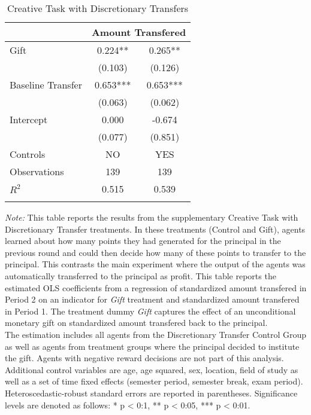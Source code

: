 \begin{table}[h]%
\setlength\tabcolsep{6pt}
\caption{Creative Task with Discretionary Transfers}
\begin{center}%
{\small\renewcommand{\arraystretch}{1.2}%
\begin{tabular}{lcc}
\hline\hline\noalign{\smallskip}
 & \multicolumn{2}{c}{\bf Amount Transfered} \\
\hline\noalign{\smallskip}
Gift                &       0.224** &       0.265** \\
                    &     (0.103)   &     (0.126)   \\
Baseline Transfer   &       0.653***&       0.653***\\
                    &     (0.063)   &     (0.062)   \\
Intercept           &       0.000   &      -0.674   \\
                    &     (0.077)   &     (0.851)   \\
\hline
 Controls & NO & YES \\
\hline
Observations        &         139   &         139   \\
$R^2$               &       0.515   &       0.539   \\
\hline\hline\noalign{\medskip}
\end{tabular}
\begin{minipage}{\textwidth}
\footnotesize {\it Note:} This table reports the results from the supplementary Creative Task with Discretionary Transfer treatments. 
In these treatments (Control and Gift), agents learned about how many points they had generated for the principal in the previous round and could then decide how many of these points to transfer to the principal. 
This contrasts the main experiment where the output of the agents was automatically transferred to the principal as profit. 
This table reports the estimated OLS coefficients from a regression of standardized amount transfered in Period 2 on an indicator for \textit{Gift} treatment and standardized amount transfered in Period 1. 
The treatment dummy \textit{Gift} captures the effect of an unconditional monetary gift on standardized amount transfered back to the principal. \\
The estimation includes all agents from the Discretionary Transfer Control Group as well as agents from treatment groups where the principal decided to institute the gift. Agents with negative reward decisions are not part of this analysis. 
Additional control variables are age, age squared, sex, location, field of study as well as a set of time fixed effects (semester period, semester break, exam period). 
Heteroscedastic-robust standard errors are reported in parentheses. Significance levels are denoted as follows: * p < 0:1, ** p < 0:05, *** p < 0:01. 
\end{minipage}}
\end{center}
\label{tab:Discretionary}
\end{table}
